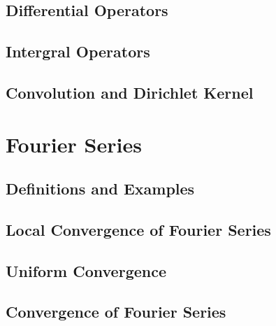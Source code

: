 \documentclass[conference,12pt,onecolumn,compsoc]{IEEEtran}
\begin{document}
\subsection{Differential Operators}
\label{section: Differential Operators}

\subsection{Intergral Operators}
\label{section: Intergral Operators}

\subsection{Convolution and Dirichlet Kernel}
\label{section: Convolution and Dirichlet Kernel}

\section{Fourier Series}
\label{section: Fourier Series}

\subsection{Definitions and Examples}
\label{section: Definitions and Examples}

\subsection{Local Convergence of Fourier Series}
\label{section: Local Convergence of Fourier Series}

\subsection{Uniform Convergence}
\label{section: Uniform Convergence}

\subsection{Convergence of Fourier Series}
\label{section: Convergence of Fourier Series}
\end{document}

